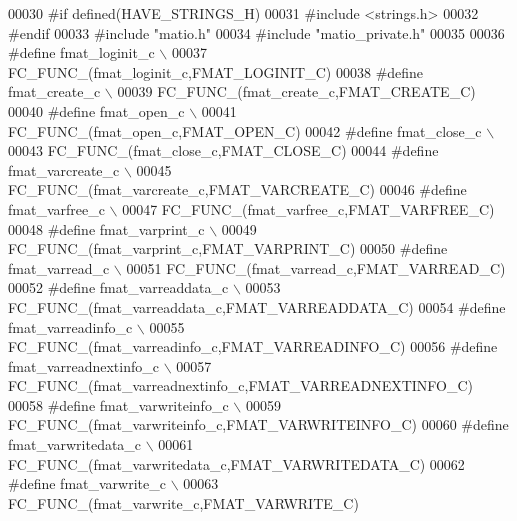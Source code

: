 \begin{DoxyCode}
00030 \textcolor{preprocessor}{#if defined(HAVE\_STRINGS\_H)}
00031 \textcolor{preprocessor}{#include <strings.h>}
00032 \textcolor{preprocessor}{#endif}
00033 \textcolor{preprocessor}{#include "matio.h"}
00034 \textcolor{preprocessor}{#include "matio\_private.h"}
00035 
00036 \textcolor{preprocessor}{#define fmat\_loginit\_c \(\backslash\)}
00037 \textcolor{preprocessor}{            FC\_FUNC\_(fmat\_loginit\_c,FMAT\_LOGINIT\_C)}
00038 \textcolor{preprocessor}{#define fmat\_create\_c \(\backslash\)}
00039 \textcolor{preprocessor}{            FC\_FUNC\_(fmat\_create\_c,FMAT\_CREATE\_C)}
00040 \textcolor{preprocessor}{#define fmat\_open\_c \(\backslash\)}
00041 \textcolor{preprocessor}{            FC\_FUNC\_(fmat\_open\_c,FMAT\_OPEN\_C)}
00042 \textcolor{preprocessor}{#define fmat\_close\_c \(\backslash\)}
00043 \textcolor{preprocessor}{            FC\_FUNC\_(fmat\_close\_c,FMAT\_CLOSE\_C)}
00044 \textcolor{preprocessor}{#define fmat\_varcreate\_c \(\backslash\)}
00045 \textcolor{preprocessor}{            FC\_FUNC\_(fmat\_varcreate\_c,FMAT\_VARCREATE\_C)}
00046 \textcolor{preprocessor}{#define fmat\_varfree\_c \(\backslash\)}
00047 \textcolor{preprocessor}{            FC\_FUNC\_(fmat\_varfree\_c,FMAT\_VARFREE\_C)}
00048 \textcolor{preprocessor}{#define fmat\_varprint\_c \(\backslash\)}
00049 \textcolor{preprocessor}{            FC\_FUNC\_(fmat\_varprint\_c,FMAT\_VARPRINT\_C)}
00050 \textcolor{preprocessor}{#define fmat\_varread\_c \(\backslash\)}
00051 \textcolor{preprocessor}{            FC\_FUNC\_(fmat\_varread\_c,FMAT\_VARREAD\_C)}
00052 \textcolor{preprocessor}{#define fmat\_varreaddata\_c \(\backslash\)}
00053 \textcolor{preprocessor}{            FC\_FUNC\_(fmat\_varreaddata\_c,FMAT\_VARREADDATA\_C)}
00054 \textcolor{preprocessor}{#define fmat\_varreadinfo\_c \(\backslash\)}
00055 \textcolor{preprocessor}{            FC\_FUNC\_(fmat\_varreadinfo\_c,FMAT\_VARREADINFO\_C)}
00056 \textcolor{preprocessor}{#define fmat\_varreadnextinfo\_c \(\backslash\)}
00057 \textcolor{preprocessor}{            FC\_FUNC\_(fmat\_varreadnextinfo\_c,FMAT\_VARREADNEXTINFO\_C)}
00058 \textcolor{preprocessor}{#define fmat\_varwriteinfo\_c \(\backslash\)}
00059 \textcolor{preprocessor}{            FC\_FUNC\_(fmat\_varwriteinfo\_c,FMAT\_VARWRITEINFO\_C)}
00060 \textcolor{preprocessor}{#define fmat\_varwritedata\_c \(\backslash\)}
00061 \textcolor{preprocessor}{            FC\_FUNC\_(fmat\_varwritedata\_c,FMAT\_VARWRITEDATA\_C)}
00062 \textcolor{preprocessor}{#define fmat\_varwrite\_c \(\backslash\)}
00063 \textcolor{preprocessor}{            FC\_FUNC\_(fmat\_varwrite\_c,FMAT\_VARWRITE\_C)}

\end{DoxyCode}
